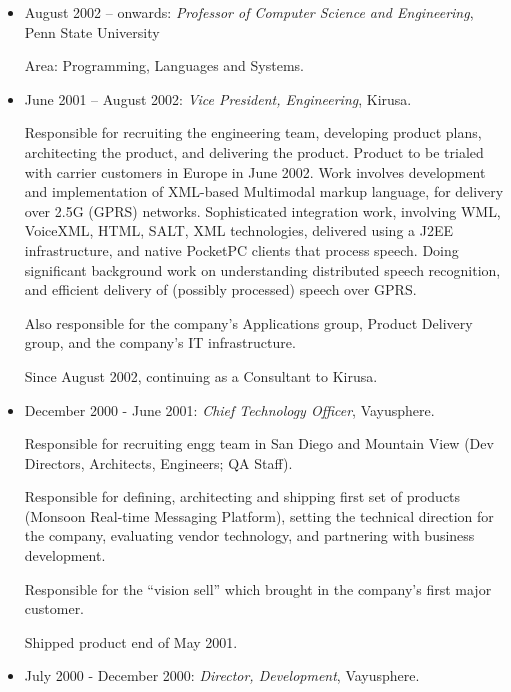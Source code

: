 \documentclass{article}
\begin{document}
\begin{itemize}


\item August 2002 -- onwards: {\em Professor of Computer Science and
Engineering}, Penn State University

 Area: Programming, Languages and Systems.

\item June 2001 -- August 2002: {\em Vice President, Engineering}, Kirusa.

  Responsible for recruiting the engineering team, developing product
  plans, architecting the product, and delivering the product.
  Product to be trialed with carrier customers in Europe in June
  2002. Work involves development and implementation of XML-based
  Multimodal markup language, for delivery over 2.5G (GPRS)
  networks. Sophisticated integration work, involving WML, VoiceXML,
  HTML, SALT, XML technologies, delivered using a J2EE infrastructure,
  and native PocketPC clients that process speech. Doing significant
  background work on understanding distributed speech recognition, and
  efficient delivery of (possibly processed) speech over GPRS.

  Also responsible for the company's Applications group, Product
  Delivery group, and the company's IT infrastructure. 

  Since August 2002, continuing as a Consultant to Kirusa.

\item December 2000 - June 2001: {\em Chief Technology Officer}, Vayusphere.

  Responsible for recruiting engg team in San Diego and Mountain View
  (Dev Directors, Architects, Engineers; QA Staff).

  Responsible for defining, architecting and shipping first set of
  products (Monsoon Real-time Messaging Platform), setting the
  technical direction for the company, evaluating vendor technology,
  and partnering with business development.

  Responsible for the ``vision sell'' which brought in the company's
  first major customer.

  Shipped product end of May 2001.
  
\item July 2000 - December 2000:  {\em Director, Development}, Vayusphere.


\end{itemize}
\end{document}
